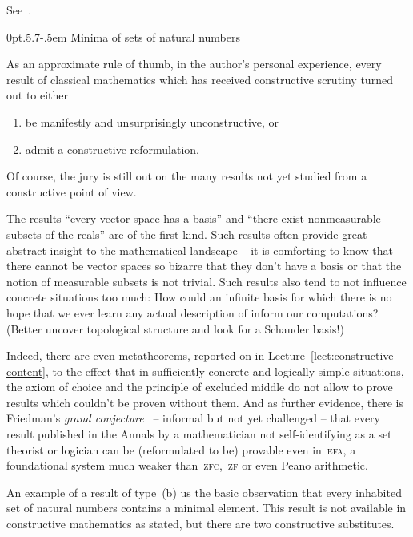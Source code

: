 \documentclass[10pt,reqno,a4paper,openany]{amsbook}
\makeatletter
\theoremstyle{definition}
\theoremstyle{plain}
\theoremstyle{remark}
\newcommand{\?}{\,{:}\,}
\renewcommand{\_}{\mathpunct{.}\,}
\renewenvironment{proof}[1][\proofname]{\par
  \pushQED{\qed}%
  \normalfont \topsep6\p@\@plus6\p@\relax
  \trivlist
  \item[\hskip\labelsep
        \itshape
    #1\@addpunct{.}]\ignorespaces
}{%
  \popQED\endtrivlist\@endpefalse
}
\def\subsection{\@startsection{subsection}{2}%
  {0pt}{.5\linespacing\@plus.7\linespacing}{-.5em}%
  {\normalfont\bfseries}}
\makeatother
\begin{document}
\begin{proof}See~\cite[Section~XXX]{mines-richman-ruitenburg:constructive-algebra}.\end{proof}


\subsection{Minima of sets of natural numbers}

As an approximate rule of thumb, in the author's personal experience, every
result of classical mathematics which has received constructive scrutiny turned
out to either
\begin{enumerate}
\item be manifestly and unsurprisingly unconstructive, or
\item admit a constructive reformulation.
\end{enumerate}
Of course, the jury is still out on the many results not yet studied from a
constructive point of view.

The results ``every vector space has a basis'' and ``there exist
nonmeasurable subsets of the reals'' are of the first kind. Such results often
provide great abstract insight to the mathematical landscape -- it is
comforting to know that there cannot be vector spaces so bizarre that they
don't have a basis or that the notion of measurable subsets is not trivial.
Such results also tend to not influence concrete situations too much: How could
an infinite basis for which there is no hope that we ever learn any actual
description of inform our computations? (Better uncover topological structure
and look for a Schauder basis!)

Indeed, there are even metatheorems, reported on in
Lecture~\ref{lect:constructive-content}, to the effect that in sufficiently
concrete and logically simple situations, the axiom of choice and the principle
of excluded middle do not allow to prove results which couldn't be proven
without them. And as further evidence, there is Friedman's \emph{grand
conjecture}~\cite{XXX} -- informal but not yet challenged -- that every result
published in the Annals by a mathematician not self-identifying as a set
theorist or logician can be (reformulated to be) provable even in~\textsc{efa},
a foundational system much weaker than~\textsc{zfc},~\textsc{zf} or even Peano
arithmetic.

An example of a result of type~(b) us the basic observation that every
inhabited set of natural numbers contains a minimal element. This result is not
available in constructive mathematics as stated, but there are two constructive
substitutes.
\end{document}
